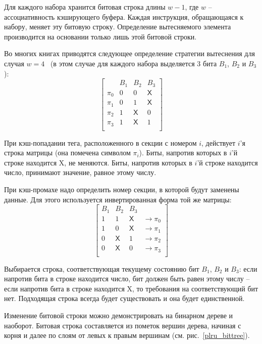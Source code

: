 Для каждого набора хранится битовая строка длины $w-1$, где $w$ --
ассоциативность кэширующего буфера. Каждая инструкция, обращающаяся
к набору, меняет эту битовую строку. Определение вытесняемого
элемента производится на основании только лишь этой битовой строки.

Во многих книгах приводятся следующее определение стратегии
вытеснения \PseudoLRU для случая
$w=4$~\cite{FundamentalOfComputerOrganizationAndDesign} (в этом
случае для каждого набора выделяется 3 бита $B_1$, $B_2$ и $B_3$):
$$ \left[
  \begin{array}{c|ccc}
          & B_1 & B_2 & B_3 \\ \hline
    \pi_0 & 0 & 0 & \textsf{X} \\
    \pi_1 & 0 & 1 & \textsf{X} \\
    \pi_2 & 1 & \textsf{X} & 0 \\
    \pi_3 & 1 & \textsf{X} & 1 \\
  \end{array}
\right]
$$

При кэш-попадании тега, расположенного в секции с номером $i$,
действует $i$'я строка матрицы (она помечена символом $\pi_i$).
Биты, напротив которых в $i$'й строке находится \textsf{X}, не
меняются. Биты, напротив которых в $i$'й строке находится число,
принимают значение, равное этому числу.

При кэш-промахе надо определить номер секции, в которой будут
заменены данные. Для этого используется инвертированная форма той же
матрицы:
$$
\left[
  \begin{array}{ccc|c}
    B_1 & B_2 & B_3 & \\ \hline
    1 & 1 & \textsf{X} & \rightarrow \pi_0 \\
    1 & 0 & \textsf{X} & \rightarrow \pi_1 \\
    0 & \textsf{X} & 1 & \rightarrow \pi_2 \\
    0 & \textsf{X} & 0 & \rightarrow \pi_3 \\
  \end{array}
\right]
$$

Выбирается строка, соответствующая текущему состоянию бит $B_1$,
$B_2$ и $B_3$: если напротив бита в строке находится число, бит
должен быть равен этому числу -- если напротив бита в строке
находится \textsf{X}, то требования на соответствующий бит нет.
Подходящая строка всегда будет существовать и она будет
единственной.

Изменение битовой строки можно демонстрировать на бинарном дереве и
наоборот. Битовая строка составляется из пометок вершин дерева,
начиная с корня и далее по слоям от левых к правым вершинам (см.
рис.~\ref{plru_bittree}).

